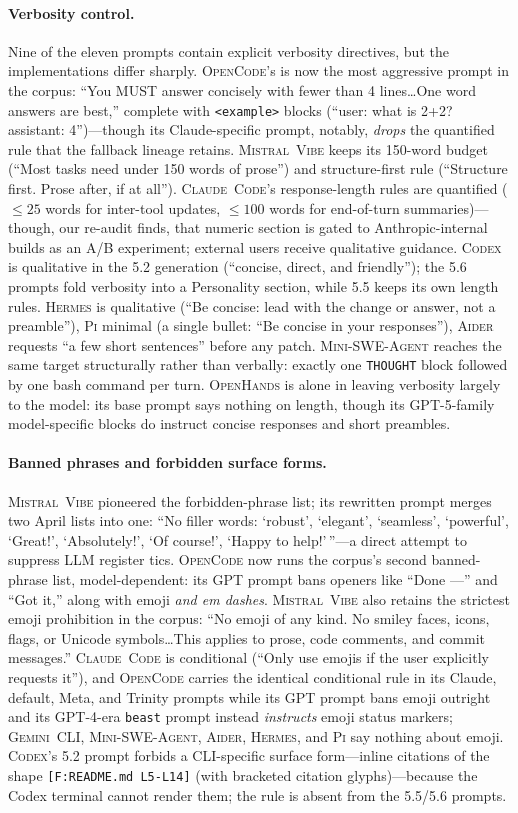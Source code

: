 \documentclass[11pt,a4paper]{article}
\newcommand{\clcode}{\textsc{Claude~Code}\xspace}
\newcommand{\cdx}{\textsc{Codex}\xspace}
\newcommand{\oh}{\textsc{OpenHands}\xspace}
\newcommand{\adr}{\textsc{Aider}\xspace}
\newcommand{\mswe}{\textsc{Mini-SWE-Agent}\xspace}
\newcommand{\vibe}{\textsc{Mistral~Vibe}\xspace}
\newcommand{\gemini}{\textsc{Gemini~CLI}\xspace}
\newcommand{\hrm}{\textsc{Hermes}\xspace}
\newcommand{\pib}{\textsc{Pi}\xspace}
\newcommand{\ocd}{\textsc{OpenCode}\xspace}
\begin{document}
\paragraph{Verbosity control.}
Nine of the eleven prompts contain explicit verbosity directives, but the implementations differ sharply.
\ocd{}'s is now the most aggressive prompt in the corpus: ``You MUST answer concisely with fewer than 4 lines\ldots One word answers are best,'' complete with \texttt{<example>} blocks (``user: what is 2+2? assistant: 4'')---though its Claude-specific prompt, notably, \emph{drops} the quantified rule that the fallback lineage retains.
\vibe{} keeps its 150-word budget (``Most tasks need under 150 words of prose'') and structure-first rule (``Structure first. Prose after, if at all'').
\clcode{}'s response-length rules are quantified ($\le 25$ words for inter-tool updates, $\le 100$ words for end-of-turn summaries)---though, our re-audit finds, that numeric section is gated to Anthropic-internal builds as an A/B experiment; external users receive qualitative guidance.
\cdx{} is qualitative in the 5.2 generation (``concise, direct, and friendly''); the 5.6 prompts fold verbosity into a Personality section, while 5.5 keeps its own length rules.
\hrm{} is qualitative (``Be concise: lead with the change or answer, not a preamble''), \pib{} minimal (a single bullet: ``Be concise in your responses''), \adr{} requests ``a few short sentences'' before any patch.
\mswe{} reaches the same target structurally rather than verbally: exactly one \texttt{THOUGHT} block followed by one bash command per turn.
\oh{} is alone in leaving verbosity largely to the model: its base prompt says nothing on length, though its GPT-5-family model-specific blocks do instruct concise responses and short preambles.

\paragraph{Banned phrases and forbidden surface forms.}
\vibe{} pioneered the forbidden-phrase list; its rewritten prompt merges two April lists into one: ``No filler words: `robust', `elegant', `seamless', `powerful', `Great!', `Absolutely!', `Of course!', `Happy to help!'\,''---a direct attempt to suppress LLM register tics.
\ocd{} now runs the corpus's second banned-phrase list, model-dependent: its GPT prompt bans openers like ``Done ---'' and ``Got it,'' along with emoji \emph{and em dashes}.
\vibe{} also retains the strictest emoji prohibition in the corpus: ``No emoji of any kind. No smiley faces, icons, flags, or Unicode symbols\ldots This applies to prose, code comments, and commit messages.''
\clcode{} is conditional (``Only use emojis if the user explicitly requests it''), and \ocd{} carries the identical conditional rule in its Claude, default, Meta, and Trinity prompts while its GPT prompt bans emoji outright and its GPT-4-era \texttt{beast} prompt instead \emph{instructs} emoji status markers; \gemini{}, \mswe{}, \adr{}, \hrm{}, and \pib{} say nothing about emoji.
\cdx{}'s 5.2 prompt forbids a CLI-specific surface form---inline citations of the shape \texttt{[F:README.md L5-L14]} (with bracketed citation glyphs)---because the Codex terminal cannot render them; the rule is absent from the 5.5/5.6 prompts.
\end{document}
